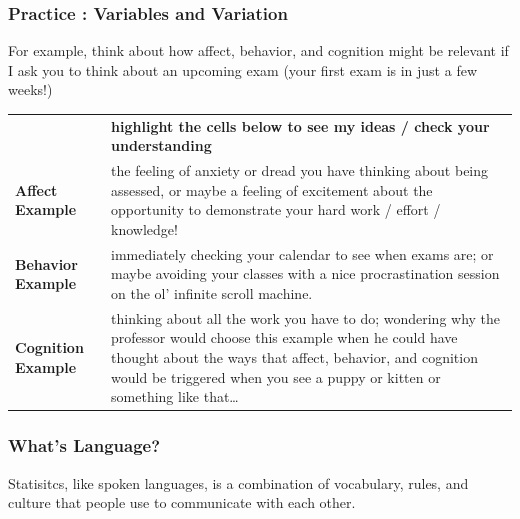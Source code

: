\documentclass[
  letterpaper,
  DIV=11,
  numbers=noendperiod,
  oneside]{scrreprt}
\begin{document}
\subsubsection{Practice : Variables and
Variation}\label{practice-variables-and-variation}

For example, think about how affect, behavior, and cognition might be
relevant if I ask you to think about an upcoming exam (your first exam
is in just a few weeks!)

\begin{longtable}[]{@{}
  >{\raggedright\arraybackslash}p{}
  >{\raggedright\arraybackslash}p{}@{}}
\toprule\noalign{}
\endhead
\bottomrule\noalign{}
\endlastfoot
& \textbf{highlight the cells below to see my ideas / check your
understanding} \\
\textbf{Affect Example} & {the feeling of anxiety or dread you have
thinking about being assessed, or maybe a feeling of excitement about
the opportunity to demonstrate your hard work / effort / knowledge!} \\
\textbf{Behavior Example} & {immediately checking your calendar to see
when exams are; or maybe avoiding your classes with a nice
procrastination session on the ol' infinite scroll machine.} \\
\textbf{Cognition Example} & {thinking about all the work you have to
do; wondering why the professor would choose this example when he could
have thought about the ways that affect, behavior, and cognition would
be triggered when you see a puppy or kitten or something like
that\ldots{}} \\
\end{longtable}

{}

\subsubsection{What's Language?}\label{whats-language}

Statisitcs, like spoken languages, is a combination of vocabulary,
rules, and culture that people use to communicate with each other.
\end{document}
